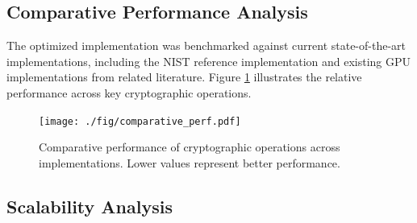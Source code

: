 \documentclass[journal]{IEEEtran}
\begin{document}


\subsection{Comparative Performance Analysis}

The optimized implementation was benchmarked against current state-of-the-art implementations, including the NIST reference implementation and existing GPU implementations from related literature. Figure \ref{fig:comparative_perf} illustrates the relative performance across key cryptographic operations.

\begin{figure}[htbp]
  \centering
  \texttt{[image: ./fig/comparative\_perf.pdf]}
  \caption{Comparative performance of cryptographic operations across implementations. Lower values represent better performance.}
  \label{fig:comparative_perf}
\end{figure}



\subsection{Scalability Analysis}
\end{document}
